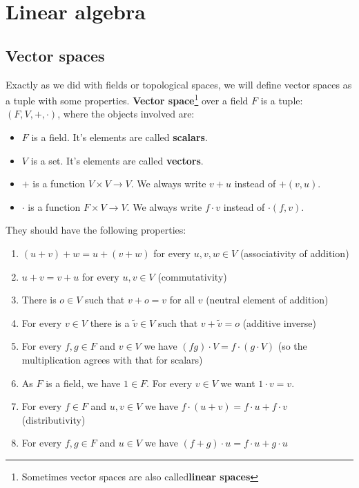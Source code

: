 \chapter{Linear algebra}
\label{linalg}
\section{Vector spaces}
Exactly as we did with fields or topological spaces, we will define vector
spaces as a tuple with some properties. \textbf{Vector space}\footnote{Sometimes vector spaces
are also called\textbf{linear spaces}} over a field $F$ is a tuple: $(F, V, +, \cdot)$, where the objects involved are:
\begin{itemize}
  \item $F$ is a field. It's elements are called \textbf{scalars}.
  \item $V$ is a set. It's elements are called \textbf{vectors}.
  \item $+$ is a function $V\times V\to V$. We always write $v+u$ instead of $+(v,u)$.
  \item $\cdot$ is a function $F\times V\to V$. We always write $f\cdot v$ instead of $\cdot(f,v)$.
\end{itemize}
They should have the following properties:
\begin{enumerate}
  \item $(u+v)+w=u+(v+w)$ for every $u,v,w\in V$ (associativity of addition)
  \item $u+v=v+u$ for every $u,v\in V$ (commutativity)
  \item There is $o\in V$ such that $v+o=v$ for all $v$ (neutral element of addition)
  \item For every $v\in V$ there is a $\tilde v\in V$ such that $v+\tilde v = o$ (additive inverse)
  \item For every $f,g\in F$ and $v\in V$ we have $(fg)\cdot V=f\cdot (g\cdot V)$ (so the multiplication agrees with that for scalars)
  \item As $F$ is a field, we have $1\in F$. For every $v\in V$ we want $1\cdot v=v$.
  \item For every $f\in F$ and $u, v \in V$ we have $f\cdot (u+v) = f\cdot u + f\cdot v$ (distributivity)
  \item For every $f, g\in F$ and $u\in V$ we have $(f+g)\cdot u=f\cdot u + g\cdot u$
\end{enumerate}

